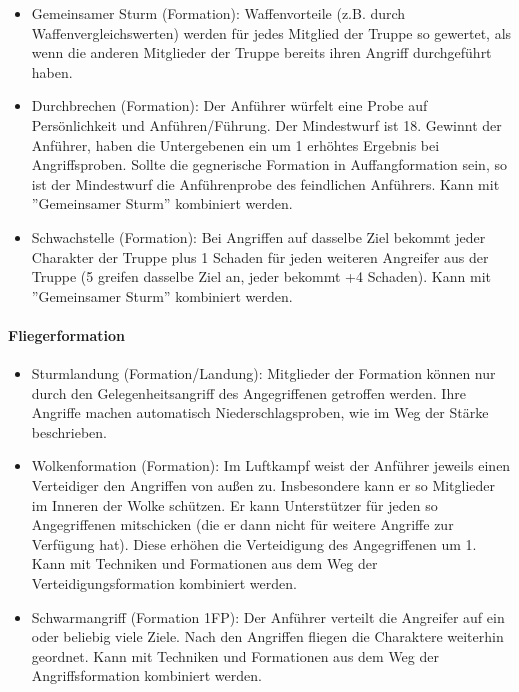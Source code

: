 \documentclass{article}
\begin{document}
\begin{itemize}
\item Gemeinsamer Sturm (Formation): Waffenvorteile (z.B. durch Waffenvergleichswerten) werden für jedes Mitglied der Truppe so gewertet, als wenn die anderen Mitglieder der Truppe bereits ihren Angriff durchgeführt haben.
\item Durchbrechen (Formation): Der Anführer würfelt eine Probe auf Persönlichkeit und Anführen/Führung. Der Mindestwurf ist 18. Gewinnt der Anführer, haben die Untergebenen ein um 1 erhöhtes Ergebnis bei Angriffsproben. Sollte die gegnerische Formation in Auffangformation sein, so ist der Mindestwurf die Anführenprobe des feindlichen Anführers. Kann mit ''Gemeinsamer Sturm'' kombiniert werden.
\item Schwachstelle (Formation): Bei Angriffen auf dasselbe Ziel bekommt jeder Charakter der Truppe plus 1 Schaden für jeden weiteren Angreifer aus der Truppe (5 greifen dasselbe Ziel an, jeder bekommt +4 Schaden). Kann mit ''Gemeinsamer Sturm'' kombiniert werden.
\end{itemize}

\paragraph{Fliegerformation}

\begin{itemize}
\item Sturmlandung (Formation/Landung): Mitglieder der Formation können nur durch den Gelegenheitsangriff des Angegriffenen getroffen werden. Ihre Angriffe machen automatisch Niederschlagsproben, wie im Weg der Stärke beschrieben.
\item Wolkenformation (Formation): Im Luftkampf weist der Anführer jeweils einen Verteidiger den Angriffen von außen zu. Insbesondere kann er so Mitglieder im Inneren der Wolke schützen. Er kann Unterstützer für jeden so Angegriffenen mitschicken (die er dann nicht für weitere Angriffe zur Verfügung hat). Diese erhöhen die Verteidigung des Angegriffenen um 1. Kann mit Techniken und Formationen aus dem Weg der Verteidigungsformation kombiniert werden.
\item Schwarmangriff (Formation 1FP): Der Anführer verteilt die Angreifer auf ein oder beliebig viele Ziele. Nach den Angriffen fliegen die Charaktere weiterhin geordnet. Kann mit Techniken und Formationen aus dem Weg der Angriffsformation kombiniert werden.
\end{itemize}
\end{document}
